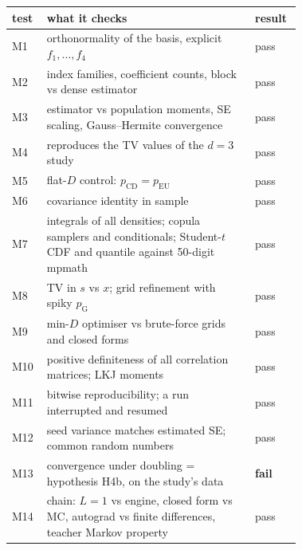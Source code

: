 \footnotesize
\begin{tabular}{@{}lp{0.72\linewidth}l@{}}
\toprule
test & what it checks & result \\
\midrule
M1 & orthonormality of the basis, explicit $f_1,\dots,f_4$ & pass \\
M2 & index families, coefficient counts, block vs dense estimator & pass \\
M3 & estimator vs population moments, SE scaling, Gauss--Hermite convergence & pass \\
M4 & reproduces the TV values of the $d=3$ study & pass \\
M5 & flat-$D$ control: $p_{\mathrm{CD}}=p_{\mathrm{EU}}$ & pass \\
M6 & covariance identity in sample & pass \\
M7 & integrals of all densities; copula samplers and conditionals; Student-$t$ CDF and quantile against 50-digit mpmath & pass \\
M8 & TV in $s$ vs $x$; grid refinement with spiky $p_{\mathrm{G}}$ & pass \\
M9 & min-$D$ optimiser vs brute-force grids and closed forms & pass \\
M10 & positive definiteness of all correlation matrices; LKJ moments & pass \\
M11 & bitwise reproducibility; a run interrupted and resumed & pass \\
M12 & seed variance matches estimated SE; common random numbers & pass \\
M13 & convergence under doubling = hypothesis H4b, on the study's data & \textbf{fail} \\
M14 & chain: $L=1$ vs engine, closed form vs MC, autograd vs finite differences, teacher Markov property & pass \\
\bottomrule
\end{tabular}
